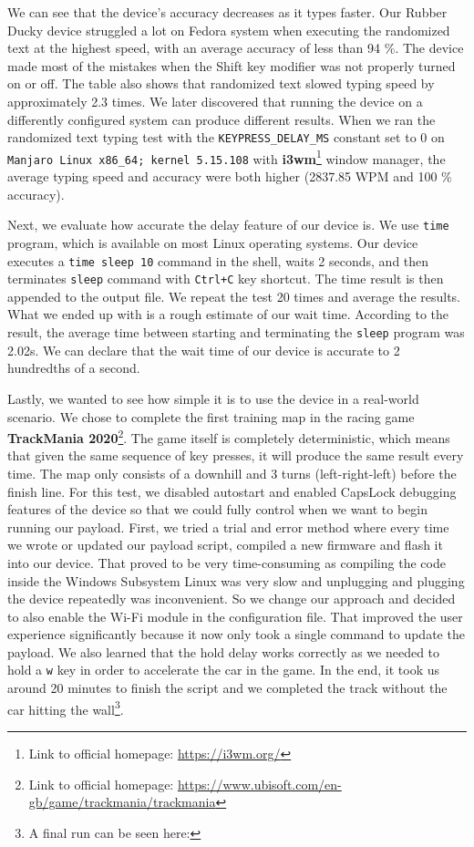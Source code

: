 We can see that the device's accuracy decreases as it types faster. Our Rubber Ducky device struggled a lot on Fedora system when executing the randomized text at the highest speed, with an average accuracy of less than 94 \%. The device made most of the mistakes when the Shift key modifier was not properly turned on or off. The table also shows that randomized text slowed typing speed by approximately 2.3 times. We later discovered that running the device on a differently configured system can produce different results. When we ran the randomized text typing test with the \verb|KEYPRESS_DELAY_MS| constant set to 0 on \verb|Manjaro Linux x86_64; kernel 5.15.108| with \textbf{i3wm}\footnote{Link to official homepage: \url{https://i3wm.org/}} window manager, the average typing speed and accuracy were both higher (2837.85 WPM and 100 \% accuracy).

Next, we evaluate how accurate the delay feature of our device is. We use \verb|time| program, which is available on most Linux operating systems. Our device executes a \verb|time sleep 10| command in the shell, waits 2 seconds, and then terminates \verb|sleep| command with \verb|Ctrl+C| key shortcut. The time result is then appended to the output file. We repeat the test 20 times and average the results. What we ended up with is a rough estimate of our wait time. According to the result, the average time between starting and terminating the \verb|sleep| program was 2.02s. We can declare that the wait time of our device is accurate to 2 hundredths of a second.

Lastly, we wanted to see how simple it is to use the device in a real-world scenario. We chose to complete the first training map in the racing game \textbf{TrackMania 2020}\footnote{Link to official homepage: \url{https://www.ubisoft.com/en-gb/game/trackmania/trackmania}}. The game itself is completely deterministic, which means that given the same sequence of key presses, it will produce the same result every time. The map only consists of a downhill and 3 turns (left-right-left) before the finish line. For this test, we disabled autostart and enabled CapsLock debugging features of the device so that we could fully control when we want to begin running our payload. First, we tried a trial and error method where every time we wrote or updated our payload script, compiled a new firmware and flash it into our device. That proved to be very time-consuming as compiling the code inside the Windows Subsystem Linux was very slow and unplugging and plugging the device repeatedly was inconvenient. So we change our approach and decided to also enable the Wi-Fi module in the configuration file. That improved the user experience significantly because it now only took a single command to update the payload. We also learned that the hold delay works correctly as we needed to hold a \verb|w| key in order to accelerate the car in the game. In the end, it took us around 20 minutes to finish the script and we completed the track without the car hitting the wall\footnote{A final run can be seen here: }.

